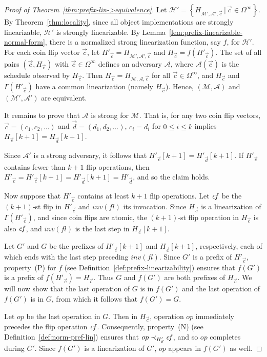 \documentclass[11pt,letterpaper]{article}
\renewcommand{\AA}{\mathcal{A}}
\newcommand{\HH}{\mathcal{H}}
\newcommand{\MM}{\mathcal{M}}
\newcommand{\vc}{{\vec{c}}}
\newcommand{\vd}{{\vec{d}}}
\newcommand{\op}{\ensuremath{\mathit{op}}}
\newcommand{\inv}[1]{\ensuremath{inv(#1)}}
\begin{document}
\begin{proof}[Proof of Theorem~\ref{thm:prefix-lin->equivalence}]
  Let $\HH'=\left\{H_{\MM',\AA',\vc}\,|\,\vc\in\Omega^\infty\right\}$.
  By Theorem~\ref{thm:locality}, since all object implementations are strongly linearizable, $\HH'$ is strongly linearizable.
  By Lemma~\ref{lem:prefix-linearizable-normal-form},
  there is a normalized strong linearization function, say $f$, for $\HH'$.
  For each coin flip vector $\vc$, let $H'_\vc=H_{\MM',\AA',\vc}$ and $H_\vc=f(H'_\vc)$.
  The set of all pairs $(\vc, H_\vc)$ with $\vc\in\Omega^\infty$ defines an adversary $\AA$, where $\AA(\vc)$ is the schedule observed by $H_\vc$.
  Then $H_\vc=H_{\MM,\AA,\vc}$ for all $\vc\in\Omega^\infty$, and $H_\vc$ and $\Gamma(H'_\vc)$ have a common linearization (namely $H_\vc$).
  Hence, $(\MM, \AA)$ and $(\MM',\AA')$ are equivalent.

  It remains to prove that $\AA$ is strong for $\MM$.
  That is, for any two coin flip vectors, $\vc=(c_1,c_2,\dots)$ and $\vec{d}=(d_1,d_2,\dots)$,
  $c_i=d_i$ for $0\leq i\leq k$ implies $H_\vc[k+1]=H_\vd[k+1]$.

  Since $\AA'$ is a strong adversary, it follows that $H'_\vc[k+1]=H'_\vd[k+1]$.
  If $H'_{\vc}$ contains fewer than $k+1$ flip operations, then $H'_\vc=H'_\vc[k+1]=H'_\vd[k+1]=H'_\vd$, and so the claim holds.

  Now suppose that $H'_{\vc}$ contains at least $k+1$ flip operations.
  Let $\mathit{cf}$ be the $(k+1)$-st flip in $H'_\vc$ and \inv{fl}  its invocation.
  Since $H_{\vc}$ is a linearization of $\Gamma(H'_{\vc})$, and since coin flips are atomic,
  the $(k+1)$-st flip operation in $H_{\vc}$ is also $\mathit{cf}$, and \inv{fl} is the last step in $H_\vc[k+1]$.

Let $G'$ and $G$ be the prefixes of $H'_\vc[k+1]$ and $H_\vc[k+1]$, respectively, each of which ends with the last step preceding \inv{fl}.
Since $G'$ is a prefix of $H'_\vc$, property~(P) for $f$ (see Definition~\ref{def:prefix-linearizability})
ensures that $f(G')$ is a prefix of $f(H'_\vc)=H_\vc$.
Thus $G$ and $f(G')$ are both prefixes of $H_\vc$.
We will now show that the last operation of $G$ is in $f(G')$ and the last operation of $f(G')$ is in $G$,
from which it follows that $f(G') = G$.

  Let $\op$ be the last operation in $G$.
  Then in $H_\vc$, operation $op$ immediately precedes the flip operation $\mathit{cf}$.
  Consequently, property~(N) (see Definition~\ref{def:norm-pref-lin}) ensures that $op\prec_{H'_\vc} \fl$,
  and so $\op$ completes during $G'$.
  Since $f(G')$ is a linearization of $G'$, $\op$ appears in $f(G')$ as well.


\end{proof}
\end{document}
